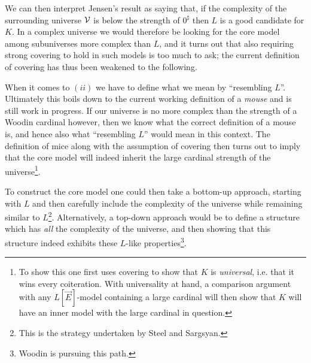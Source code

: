 \documentclass[../../main]{subfiles}
\begin{document}

We can then interpret Jensen's result as saying that, if the complexity of the surrounding universe $\operatorname{\mathcal V}$ is below the strength of $0^\sharp$ then $L$ is a good candidate for $K$. In a complex universe we would therefore be looking for the core model among subuniverses more complex than $L$, and it turns out  that also requiring strong covering to hold in such models is too much to ask; the current definition of covering has thus been weakened to the following.



\qquad When it comes to $(ii)$ we have to define what we mean by ``resembling $L$''. Ultimately this boils down to the current working definition of a \textit{mouse} and is still work in progress. If our universe is no more complex than the strength of a Woodin cardinal however, then we know what the correct definition of a mouse is, and hence also what ``resembling $L$'' would mean in this context.  The definition of mice along with the assumption of covering then turns out to imply that the core model will indeed inherit the large cardinal strength of the universe\footnote{To show this one first uses covering to show that $K$ is \textit{universal}, i.e. that it wins every coiteration. With universality at hand, a comparison argument with any $L[\vec E]$-model containing a large cardinal will then show that $K$ will have an inner model with the large cardinal in question.}.

\qquad To construct the core model one could then take a bottom-up approach, starting with $L$ and then carefully include the complexity of the universe while remaining similar to $L$\footnote{This is the strategy undertaken by Steel and Sargsyan.}. Alternatively, a top-down approach would be to define a structure which has \textit{all} the complexity of the universe, and then showing that this structure indeed exhibits these $L$-like properties\footnote{Woodin is pursuing this path.}.
\end{document}
